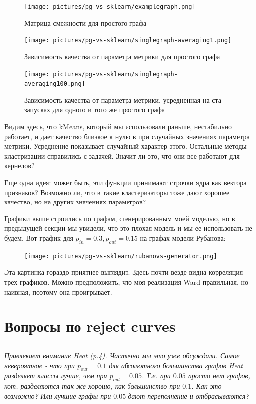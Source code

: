 \documentclass{article}
\begin{document}
\begin{figure}[H]
	\texttt{[image: pictures/pg-vs-sklearn/examplegraph.png]}
	\caption{\label{f_vs2} Матрица смежности для простого графа}
\end{figure}

\begin{figure}[H]
	\texttt{[image: pictures/pg-vs-sklearn/singlegraph-averaging1.png]}
	\caption{\label{f_vs2} Зависимость качества от параметра метрики для простого графа}
\end{figure}

\begin{figure}[H]
	\texttt{[image: pictures/pg-vs-sklearn/singlegraph-averaging100.png]}
	\caption{\label{f_vs2} Зависимость качества от параметра метрики, усредненная на ста запусках для одного и того же простого графа}
\end{figure}

Видим здесь, что kMeans, который мы использовали раньше, нестабильно работает, и дает качество близкое к нулю в при случайных значениях параметра метрики. Усреднение показывает случайный характер этого. Остальные методы кластризации справились с задачей. Значит ли это, что они все работают для кернелов?

Еще одна идея: может быть, эти функции принимают строчки ядра как вектора признаков? Возможно ли, что в такие кластеризаторы тоже дают хорошее качество, но на других значениях параметров?

Графики выше строились по графам, сгенерированным моей моделью, но в предыдущей секции мы увидели, что это плохая модель и мы ее использовать не будем. Вот график для $p_{in} = 0.3, p_{out} = 0.15$ на графах модели Рубанова:


\begin{figure}[H]
	\texttt{[image: pictures/pg-vs-sklearn/rubanovs-generator.png]}
	\caption{\label{f_vs2}}
\end{figure}

Эта картинка гораздо приятнее выглядит. Здесь почти везде видна корреляция трех графиков. Можно предположить, что моя реализация Ward правильная, но наивная, поэтому она проигрывает.


\section{Вопросы по reject curves}

\subsection{}
\textit{Привлекает внимание Heat (p.4). Частично мы это уже обсуждали. Самое невероятное - что при $p_{out} = 0.1$ для абсолютного большинства графов Heat разделяет классы лучше, чем при $p_{out} = 0.05$. Т.е. при $0.05$ просто нет графов, кот. разделяются так же хорошо, как большинство при $0.1$. Как это возможно? Или лучшие графы при $0.05$ дают переполнение и отбрасываются?}
	
\end{document}
